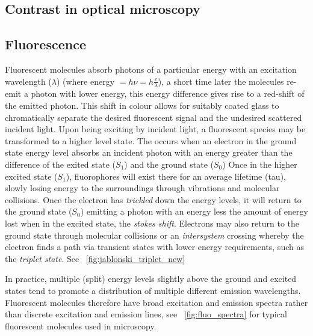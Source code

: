 \subsection{Contrast in optical microscopy}
\subsection{Fluorescence}

Fluorescent molecules absorb photons of a particular energy with an excitation wavelength (\(\lambda\)) (where energy \(= h \nu = h \frac{c}{\lambda}\)), a short time later the molecules re-emit a photon with lower energy, this energy difference gives rise to a red-shift of the emitted photon.
This shift in colour allows for suitably coated glass to chromatically separate the desired fluorescent signal and the undesired scattered incident light.
Upon being exciting by incident light, a fluorescent species may be transformed to a higher level state.
The occurs when an electron in the ground state energy level absorbs an incident photon with an energy greater than the difference of the exited state ($S_1$) and the ground state ($S_0$)
Once in the higher excited state ($S_1$), fluorophores will exist there for an average lifetime (\gls{tau}), slowly losing energy to the surroundings through vibrations and molecular collisions.
Once the electron has \emph{trickled} down the energy levels, it will return to the ground state ($S_0$) emitting a photon with an energy less the amount of energy lost when in the excited state, the \emph{\Gls{stokes shift}}.
Electrons may also return to the ground state through molecular collisions or an \emph{intersystem} crossing whereby the electron finds a path via transient states with lower energy requirements, such as the \emph{triplet state}.
See \figurename~\ref{fig:jablonski_triplet_new}

In practice, multiple (split) energy levels slightly above the ground and excited states tend to promote a distribution of multiple different emission wavelengths.
Fluorescent molecules therefore have broad excitation and emission spectra rather than discrete excitation and emission lines, see \figurename~\ref{fig:fluo_spectra} for typical fluorescent molecules used in microscopy.

